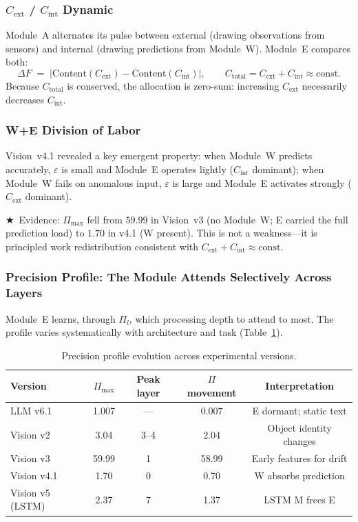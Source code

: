 \documentclass[12pt,a4paper]{article}
\newcommand{\Cext}{C_{\mathrm{ext}}}
\newcommand{\Cint}{C_{\mathrm{int}}}
\newcommand{\starred}{\textbf{\textcolor{pbtblue}{$\bigstar$}}~}
\begin{document}
\subsubsection{$\Cext$ / $\Cint$ Dynamic}

Module~A alternates its pulse between external (drawing observations from
sensors) and internal (drawing predictions from Module~W). Module~E compares
both:
\begin{equation}
  \Delta F \;=\; \bigl|\mathrm{Content}(\Cext) - \mathrm{Content}(\Cint)\bigr|,
  \qquad C_{\mathrm{total}} = \Cext + \Cint \approx \mathrm{const}.
  \label{eq:Csplit}
\end{equation}
Because $C_{\mathrm{total}}$ is conserved, the allocation is zero-sum:
increasing $\Cext$ necessarily decreases $\Cint$.

\subsubsection{W+E Division of Labor}

Vision~v4.1 revealed a key emergent property: when Module~W predicts accurately,
$\varepsilon$ is small and Module~E operates lightly ($\Cint$ dominant); when
Module~W fails on anomalous input, $\varepsilon$ is large and Module~E activates
strongly ($\Cext$ dominant).

\starred Evidence: $\Pi_{\max}$ fell from $59.99$ in Vision~v3 (no Module~W;
E carried the full prediction load) to $1.70$ in v4.1 (W present). This is not
a weakness---it is principled work redistribution consistent with
$\Cext + \Cint \approx\mathrm{const}$.

\subsubsection{Precision Profile: The Module Attends Selectively Across Layers}

Module~E learns, through $\Pi_l$, which processing depth to attend to most.
The profile varies systematically with architecture and task
(Table~\ref{tab:precision_profile}).

\begin{table}[ht]
\centering
\caption{Precision profile evolution across experimental versions.}
\label{tab:precision_profile}
\small
\begin{tabular}{@{}lcccc@{}}
\toprule
\textbf{Version} & $\Pi_{\max}$ & \textbf{Peak layer}
  & $\Pi$ movement & \textbf{Interpretation} \\
\midrule
LLM v6.1          & 1.007 & ---   & 0.007  & E dormant; static text \\
Vision v2          & 3.04  & 3--4  & 2.04   & Object identity changes \\
Vision v3          & 59.99 & 1     & 58.99  & Early features for drift \\
Vision v4.1        & 1.70  & 0     & 0.70   & W absorbs prediction \\
Vision v5 (LSTM)   & 2.37  & 7     & 1.37   & LSTM M frees E \\
\bottomrule
\end{tabular}
\end{table}
\end{document}
